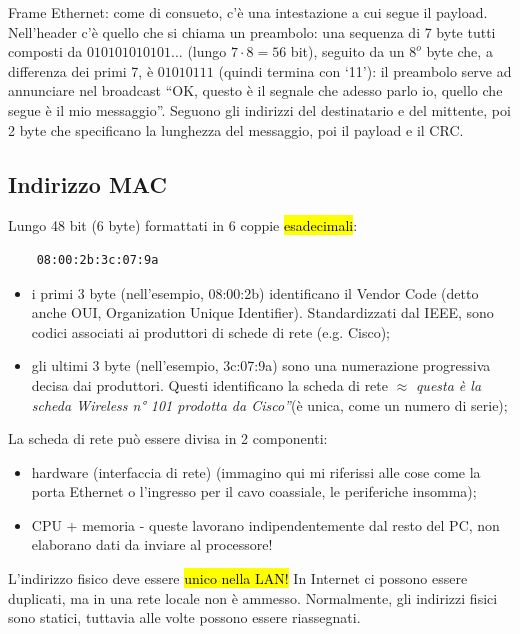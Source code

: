 \noindent Frame Ethernet: come di consueto, c'è una intestazione a cui segue il payload.\\
\noindent Nell'header c'è quello che si chiama un preambolo: una sequenza di 7 byte tutti composti da $010101010101...$ (lungo $7\cdot8=56$ bit), seguito da un $8^o$ byte che, a differenza dei primi 7, è $01010111$ (quindi termina con `11'): il preambolo serve ad annunciare nel broadcast ``OK, questo è il segnale che adesso parlo io, quello che segue è il mio messaggio''. Seguono gli indirizzi del destinatario e del mittente, poi 2 byte che specificano la lunghezza del messaggio, poi il payload e il CRC.\\
\subsection*{Indirizzo MAC}
\noindent Lungo 48 bit (6 byte) formattati in 6 coppie \hl{esadecimali}:
\begin{verbatim}
    08:00:2b:3c:07:9a
\end{verbatim}

\begin{itemize}
    \item i primi 3 byte (nell'esempio, 08:00:2b) identificano il Vendor Code (detto anche OUI, Organization Unique Identifier). Standardizzati dal IEEE, sono codici associati ai produttori di schede di rete (e.g. Cisco);
    \item gli ultimi 3 byte (nell'esempio, 3c:07:9a) sono una numerazione progressiva decisa dai produttori. Questi identificano la scheda di rete $\approx$ \textit{\openapex questa è la scheda Wireless n° 101 prodotta da Cisco''}(è unica, come un numero di serie);
\end{itemize}

\noindent La scheda di rete può essere divisa in 2 componenti:
\begin{itemize}
    \item hardware (interfaccia di rete) (immagino qui mi riferissi alle cose come la porta Ethernet o l'ingresso per il cavo coassiale, le periferiche insomma);
    \item CPU + memoria - queste lavorano indipendentemente dal resto del PC, non elaborano dati da inviare al processore!
\end{itemize}

\noindent L'indirizzo fisico deve essere \hl{unico nella LAN!} In Internet ci possono essere duplicati, ma in una rete locale non è ammesso. Normalmente, gli indirizzi fisici sono statici, tuttavia alle volte possono essere riassegnati.\\

